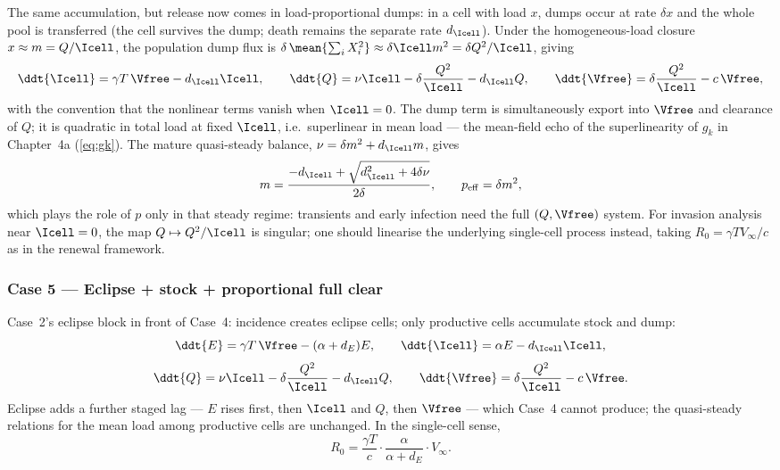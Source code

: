 The same accumulation, but release now comes in load-proportional dumps: in
a cell with load $x$, dumps occur at rate $\delta x$ and the whole pool is
transferred (the cell survives the dump; death remains the separate rate
$d_{\Icell}$). Under the homogeneous-load closure $x\approx m=Q/\Icell$,
the population dump flux is $\delta\,\mean{\sum_i X_i^2}\approx
\delta\Icell m^2=\delta Q^2/\Icell$, giving
\begin{equation}
\ddt{\Icell}=\gamma T\,\Vfree-d_{\Icell}\Icell,
\qquad
\ddt{Q}=\nu\Icell-\delta\frac{Q^2}{\Icell}-d_{\Icell}Q,
\qquad
\ddt{\Vfree}=\delta\frac{Q^2}{\Icell}-c\,\Vfree,
\end{equation}
with the convention that the nonlinear terms vanish when $\Icell=0$. The
dump term is simultaneously export into $\Vfree$ and clearance of $Q$; it
is quadratic in total load at fixed $\Icell$, i.e.\ superlinear in mean
load --- the mean-field echo of the superlinearity of $g_k$ in
Chapter~4a (\eqref{eq:gk}). The mature quasi-steady balance,
$\nu=\delta m^2+d_{\Icell}m$, gives
\begin{equation}
m=\frac{-d_{\Icell}+\sqrt{d_{\Icell}^2+4\delta\nu}}{2\delta},
\qquad
p_{\mathrm{eff}}=\delta m^2,
\end{equation}
which plays the role of $p$ only in that steady regime: transients and
early infection need the full $(Q,\Vfree)$ system. For invasion analysis
near $\Icell=0$, the map $Q\mapsto Q^2/\Icell$ is singular; one should
linearise the underlying single-cell process instead, taking
$R_0=\gamma T V_\infty/c$ as in the renewal framework.

\subsubsection{Case 5 --- Eclipse + stock + proportional full clear}

Case~2's eclipse block in front of Case~4: incidence creates eclipse cells;
only productive cells accumulate stock and dump:
\begin{equation}
\ddt{E}=\gamma T\,\Vfree-(\alpha+d_E)E,
\qquad
\ddt{\Icell}=\alpha E-d_{\Icell}\Icell,
\end{equation}
\begin{equation}
\ddt{Q}=\nu\Icell-\delta\frac{Q^2}{\Icell}-d_{\Icell}Q,
\qquad
\ddt{\Vfree}=\delta\frac{Q^2}{\Icell}-c\,\Vfree.
\end{equation}
Eclipse adds a further staged lag --- $E$ rises first, then $\Icell$ and
$Q$, then $\Vfree$ --- which Case~4 cannot produce; the quasi-steady
relations for the mean load among productive cells are unchanged. In the
single-cell sense,
\begin{equation}
R_0=\frac{\gamma T}{c}\cdot\frac{\alpha}{\alpha+d_E}\cdot V_\infty.
\end{equation}

